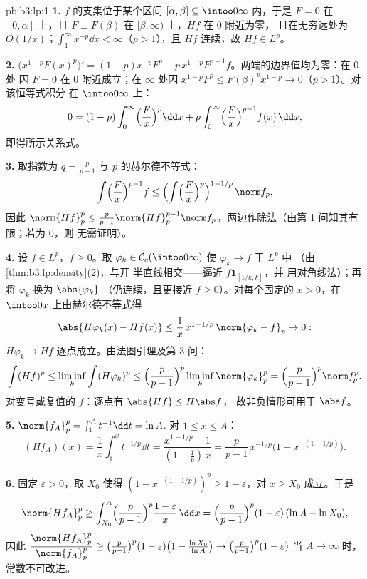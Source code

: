 \begin{solution}{pb:b3:lp:1}
\textbf{1.} $f$ 的支集位于某个区间 $[\alpha, \beta]
\subseteq \intoo0\infty$ 内，于是 $F = 0$ 在 $[0, \alpha]$ 上，且 $F
\equiv F(\beta)$ 在 $[\beta, \infty)$ 上，$Hf$ 在 $0$ 附近为零，
且在无穷远处为 $O(1/x)$；$\int_1^\infty x^{-p}\dd x <
\infty$（$p > 1$），且 $Hf$ 连续，故 $Hf \in L^p$。

\textbf{2.} $\bigl(x^{1-p}F(x)^p\bigr)' = (1-p)x^{-p}F^p +
p\,x^{1-p}F^{p-1}f$。两端的边界值均为零：在 $0$ 处
因 $F = 0$ 在 $0$ 附近成立；在 $\infty$ 处因 $x^{1-p}F^p \leq
F(\beta)^p x^{1-p} \to 0$（$p > 1$）。对该恒等式积分
在 $\intoo0\infty$ 上：
\[
0 = (1 - p)\int_0^\infty\Bigl(\frac Fx\Bigr)^p\dd x
+ p\int_0^\infty\Bigl(\frac Fx\Bigr)^{p-1}f(x)\,\dd x,
\]
即得所示关系式。

\textbf{3.} 取指数为 $q = \frac p{p-1}$ 与 $p$ 的赫尔德不等式：
\[
\int\Bigl(\frac Fx\Bigr)^{p-1}f
\leq \Bigl(\int\Bigl(\frac
Fx\Bigr)^{p}\Bigr)^{1 - 1/p}\,\norm f_p ,
\]
因此 $\norm{Hf}_p^p \leq \frac p{p-1}\norm{Hf}_p^{p-1}\norm
f_p$，两边作除法（由第 1 问知其有限；若为 $0$，则
无需证明）。

\textbf{4.} 设 $f \in L^p$，$f \geq 0$。取 $\varphi_k \in
\mathcal C_c(\intoo0\infty)$ 使 $\varphi_k \to f$ 于 $L^p$ 中
（由\cref{thm:b3:lp:density}(2)，与开
半直线相交——逼近 $f\mathbf 1_{[1/k, k]}$，并
用对角线法）；再将 $\varphi_k$ 换为 $\abs{\varphi_k}$
（仍连续，且更接近 $f \geq 0$）。对每个固定的
$x > 0$，在 $\intoo0x$ 上由赫尔德不等式得
\[
\abs{H\varphi_k(x) - Hf(x)} \leq
\frac1x\,x^{1 - 1/p}\,\norm{\varphi_k - f}_p \to 0 :
\]
$H\varphi_k \to Hf$ 逐点成立。由法图引理及第 3 问：
\[
\int (Hf)^p \leq \liminf_k\int(H\varphi_k)^p
\leq \Bigl(\frac p{p-1}\Bigr)^p\liminf_k\norm{\varphi_k}_p^p
= \Bigl(\frac p{p-1}\Bigr)^p\norm f_p^p .
\]
对变号或复值的 $f$：逐点有 $\abs{Hf} \leq H\abs f$，
故非负情形可用于 $\abs f$。

\textbf{5.} $\norm{f_A}_p^p = \int_1^A t^{-1}\dd t = \ln A$.
对 $1 \leq x \leq A$：
\[
(Hf_A)(x) = \frac1x\int_1^x t^{-1/p}\dd t
= \frac{x^{1 - 1/p} - 1}{(1 - \tfrac1p)\,x}
= \frac p{p-1}\,x^{-1/p}\bigl(1 - x^{-(1 - 1/p)}\bigr).
\]

\textbf{6.} 固定 $\varepsilon > 0$，取 $X_0$ 使得 $(1 -
x^{-(1-1/p)})^p \geq 1 - \varepsilon$，对 $x \geq X_0$ 成立。于是
\[
\norm{Hf_A}_p^p \geq \int_{X_0}^A\Bigl(\frac
p{p-1}\Bigr)^p\frac{1 - \varepsilon}{x}\,\dd x
= \Bigl(\frac p{p-1}\Bigr)^p(1 - \varepsilon)\,(\ln A - \ln
X_0),
\]
因此 $\dfrac{\norm{Hf_A}_p^p}{\norm{f_A}_p^p} \geq \bigl(\frac
p{p-1}\bigr)^p(1 - \varepsilon)\bigl(1 - \frac{\ln X_0}{\ln
A}\bigr) \to \bigl(\frac p{p-1}\bigr)^p(1 - \varepsilon)$ 当
$A \to \infty$ 时，常数不可改进。


\end{solution}
